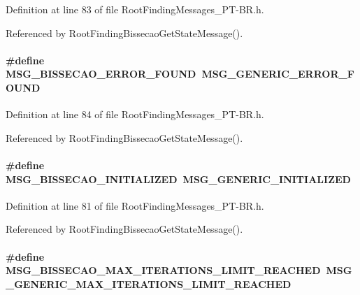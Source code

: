 Definition at line 83 of file RootFindingMessages\_\-PT-BR.h.

Referenced by RootFindingBissecaoGetStateMessage().\hypertarget{group____messages_g045864209c190bf6517acac3482a4eeb}{
\paragraph[MSG\_\-BISSECAO\_\-ERROR\_\-FOUND]{\setlength{\rightskip}{0pt plus 5cm}\#define MSG\_\-BISSECAO\_\-ERROR\_\-FOUND~MSG\_\-GENERIC\_\-ERROR\_\-FOUND}\hfill}
\label{group____messages_g045864209c190bf6517acac3482a4eeb}




Definition at line 84 of file RootFindingMessages\_\-PT-BR.h.

Referenced by RootFindingBissecaoGetStateMessage().\hypertarget{group____messages_gd7a7400cbd6447204201e1338a9faf5e}{
\paragraph[MSG\_\-BISSECAO\_\-INITIALIZED]{\setlength{\rightskip}{0pt plus 5cm}\#define MSG\_\-BISSECAO\_\-INITIALIZED~MSG\_\-GENERIC\_\-INITIALIZED}\hfill}
\label{group____messages_gd7a7400cbd6447204201e1338a9faf5e}




Definition at line 81 of file RootFindingMessages\_\-PT-BR.h.

Referenced by RootFindingBissecaoGetStateMessage().\hypertarget{group____messages_gad91cc85f95e709099e9e0b7c4c78648}{
\paragraph[MSG\_\-BISSECAO\_\-MAX\_\-ITERATIONS\_\-LIMIT\_\-REACHED]{\setlength{\rightskip}{0pt plus 5cm}\#define MSG\_\-BISSECAO\_\-MAX\_\-ITERATIONS\_\-LIMIT\_\-REACHED~MSG\_\-GENERIC\_\-MAX\_\-ITERATIONS\_\-LIMIT\_\-REACHED}\hfill}
\label{group____messages_gad91cc85f95e709099e9e0b7c4c78648}




